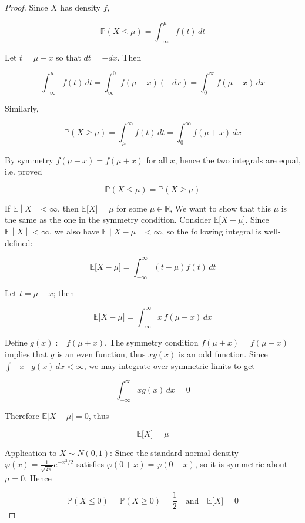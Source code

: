 \documentclass{qlnotes-export}
\begin{document}
\begin{proof}

Since \(X\) has density \(f\),

\[{\mathbb{P}}(X \leq \mu) = \int_{- \infty}^{\mu}f(t)\, dt\]

Let \(t = \mu - x\) so that \(dt = - dx\). Then

\[\int_{- \infty}^{\mu}f(t)\, dt = \int_{\infty}^{0}f(\mu - x)( - dx) = \int_{0}^{\infty}f(\mu - x)\, dx\]

Similarly,

\[{\mathbb{P}}(X \geq \mu) = \int_{\mu}^{\infty}f(t)\, dt = \int_{0}^{\infty}f(\mu + x)\, dx\]

By symmetry \(f(\mu - x) = f(\mu + x)\) for all \(x\), hence the two integrals are equal, i.e. proved

\[{\mathbb{P}}(X \leq \mu) = {\mathbb{P}}(X \geq \mu)\]

If \(\left. {\mathbb{E}} \middle| X \middle| < \infty \right.\), then \({\mathbb{E}}\lbrack X\rbrack = \mu\) for some \(\mu \in {\mathbb{R}}\), We want to show that this \(\mu\) is the same as the one in the symmetry condition. Consider \({\mathbb{E}}\lbrack X - \mu\rbrack\). Since \(\left. {\mathbb{E}} \middle| X \middle| < \infty \right.\), we also have \(\left. {\mathbb{E}} \middle| X - \mu \middle| < \infty \right.\), so the following integral is well-defined:

\[{\mathbb{E}}\lbrack X - \mu\rbrack = \int_{- \infty}^{\infty}(t - \mu)f(t)\, dt\]

Let \(t = \mu + x\); then

\[{\mathbb{E}}\lbrack X - \mu\rbrack = \int_{- \infty}^{\infty}x\, f(\mu + x)\, dx\]

Define \(g(x) := f(\mu + x)\). The symmetry condition \(f(\mu + x) = f(\mu - x)\) implies that \(g\) is an even function, thus \(xg(x)\) is an odd function. Since \(\left. \int \middle| x \middle| g(x)\, dx < \infty \right.\), we may integrate over symmetric limits to get

\[\int_{- \infty}^{\infty}xg(x)\, dx = 0\]

Therefore \({\mathbb{E}}\lbrack X - \mu\rbrack = 0\), thus

\[{\mathbb{E}}\lbrack X\rbrack = \mu\]

Application to \(X \sim N(0,1)\): Since the standard normal density \(\varphi(x) = \frac{1}{\sqrt{2\pi}}e^{- x^{2}/2}\) satisfies \(\varphi(0 + x) = \varphi(0 - x)\), so it is symmetric about \(\mu = 0\). Hence

\[{\mathbb{P}}(X \leq 0) = {\mathbb{P}}(X \geq 0) = \frac{1}{2}\quad\text{and}\quad{\mathbb{E}}\lbrack X\rbrack = 0\]

\end{proof}
\end{document}
